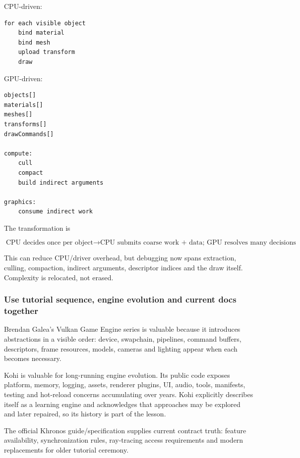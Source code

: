 CPU-driven:

\begin{verbatim}
for each visible object
    bind material
    bind mesh
    upload transform
    draw
\end{verbatim}

GPU-driven:

\begin{verbatim}
objects[]
materials[]
meshes[]
transforms[]
drawCommands[]

compute:
    cull
    compact
    build indirect arguments

graphics:
    consume indirect work
\end{verbatim}

The transformation is

\[
\boxed{
\text{CPU decides once per object}
\rightarrow
\text{CPU submits coarse work + data; GPU resolves many decisions}
}
\]

This can reduce CPU/driver overhead, but debugging now spans extraction, culling, compaction, indirect arguments, descriptor indices and the draw itself. Complexity is relocated, not erased.

\subsubsection{Use tutorial sequence, engine evolution and current docs together}\label{05-engine-i-ch023-use-tutorial-sequence-engine-evolution-and-current-docs-together}

\hypertarget{05-engine-i-ch023-use-tutorial-sequence-engine-evolution-and-current-docs-together}{}

Brendan Galea's Vulkan Game Engine series is valuable because it introduces abstractions in a visible order: device, swapchain, pipelines, command buffers, descriptors, frame resources, models, cameras and lighting appear when each becomes necessary.

Kohi is valuable for long-running engine evolution. Its public code exposes platform, memory, logging, assets, renderer plugins, UI, audio, tools, manifests, testing and hot-reload concerns accumulating over years. Kohi explicitly describes itself as a learning engine and acknowledges that approaches may be explored and later repaired, so its history is part of the lesson.

The official Khronos guide/specification supplies current contract truth: feature availability, synchronization rules, ray-tracing access requirements and modern replacements for older tutorial ceremony.

